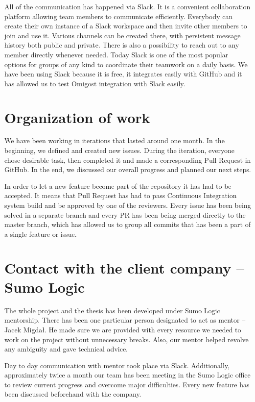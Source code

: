 \documentclass[licencjacka,en]{thesisclass}
\begin{document}
    All of the communication has happened via Slack.
    It is a convenient collaboration platform allowing team members
    to communicate efficiently.
    Everybody can create their own instance of a Slack workspace and then
    invite other members to join and use it.
    Various channels can be created there,
    with persistent message history both public and private.
    There is also a possibility to reach out to any member directly whenever needed.
    Today Slack is one of the most popular options for groups of any kind to coordinate
    their teamwork on a daily basis.
    We have been using Slack because it is free, it integrates easily with GitHub
    and it has allowed us to test Omigost integration with Slack easily.

    \section{Organization of work}

    We have been working in iterations that lasted around one month.
    In the beginning, we defined and created new issues.
    During the iteration, everyone chose desirable task,
    then completed it and made a corresponding Pull Request in GitHub.
    In the end, we discussed our overall progress and planned our next steps.

    In order to let a new feature become part of the repository it has had to be accepted.
    It means that Pull Request has had to pass Continuous Integration
    system build and be approved by one of the reviewers.
    Every issue has been being solved in a separate branch and every PR
    has been being merged directly to the master branch, which has allowed us
    to group all commits that has been a part of a single feature or issue.

    \section{Contact with the client company -- Sumo Logic}

    The whole project and the thesis has been developed under Sumo Logic mentorship.
    There has been one particular person designated to act as mentor -- Jacek Migdał.
    He made sure we are provided with every resource we needed to
    work on the project without unnecessary breaks.
    Also, our mentor helped revolve any ambiguity and gave technical advice.

    Day to day communication with mentor took place via Slack.
    Additionally, approximately twice a month our team has been meeting
    in the Sumo Logic office to review current progress and overcome major difficulties.
    Every new feature has been discussed beforehand with the company.
\end{document}
